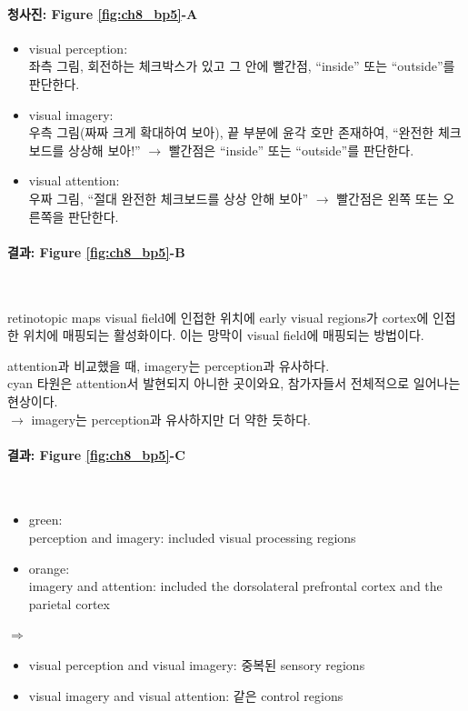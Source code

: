 \documentclass[../note.tex]{subfiles}
\begin{document}
{  \paragraph{청사진: Figure \ref{fig:ch8_bp5}-A}
  \begin{itemize}
    \item visual perception:\\
      좌측 그림, 회전하는 체크박스가 있고 그 안에 빨간점, ``inside'' 또는 ``outside''를 판단한다.
    \item visual imagery:\\
      우측 그림(짜짜 크게 확대하여 보아), 끝 부분에 윤각 호만 존재하여, ``완전한 체크보드를 상상해 보아!''
      $\longrightarrow$ 빨간점은 ``inside'' 또는 ``outside''를 판단한다.
    \item visual attention:\\
      우짜 그림, ``절대 완전한 체크보드를 상상 안해 보아''
      $\longrightarrow$ 빨간점은 왼쪽 또는 오른쪽을 판단한다.
  \end{itemize}

  \paragraph{결과: Figure \ref{fig:ch8_bp5}-B}\\
  \begin{definition}{retinotopic maps}
    visual field에 인접한 위치에 early visual regions가 cortex에 인접한 위치에 매핑되는 활성화이다.
    이는 망막이 visual field에 매핑되는 방법이다.
  \end{definition}
  attention과 비교했을 때, imagery는 perception과 유사하다.\\
  cyan 타원은 attention서 발현되지 아니한 곳이와요, 참가자들서 전체적으로 일어나는 현상이다.\\
  $\rightarrow$ imagery는 perception과 유사하지만 더 약한 듯하다.

  \paragraph{결과: Figure \ref{fig:ch8_bp5}-C}\\
  \begin{itemize}
    \item green:\\
      perception and imagery: included visual processing regions
    \item orange:\\
      imagery and attention: included the dorsolateral prefrontal cortex and the parietal cortex
  \end{itemize}

  $\Longrightarrow$
  \begin{itemize}
    \item visual perception and visual imagery: 중복된 sensory regions
    \item visual imagery and visual attention: 같은 control regions
  \end{itemize}
}
\end{document}
